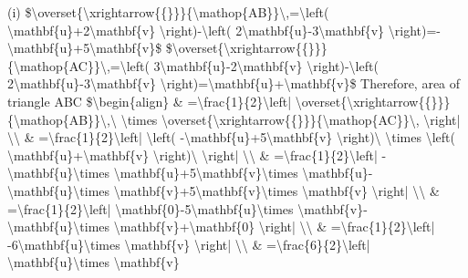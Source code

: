 \item {}

(i) \$\textbackslash overset\{\textbackslash xrightarrow\{\{\}\}\}\{\textbackslash mathop\{AB\}\}\textbackslash ,=\textbackslash left(
\textbackslash mathbf\{u\}+2\textbackslash mathbf\{v\} \textbackslash right)-\textbackslash left(
2\textbackslash mathbf\{u\}-3\textbackslash mathbf\{v\} \textbackslash right)=-\textbackslash mathbf\{u\}+5\textbackslash mathbf\{v\}\$
\$\textbackslash overset\{\textbackslash xrightarrow\{\{\}\}\}\{\textbackslash mathop\{AC\}\}\textbackslash ,=\textbackslash left(
3\textbackslash mathbf\{u\}-2\textbackslash mathbf\{v\} \textbackslash right)-\textbackslash left(
2\textbackslash mathbf\{u\}-3\textbackslash mathbf\{v\} \textbackslash right)=\textbackslash mathbf\{u\}+\textbackslash mathbf\{v\}\$
Therefore, area of triangle ABC \$\textbackslash begin\{align\} \&
=\textbackslash frac\{1\}\{2\}\textbackslash left| \textbackslash overset\{\textbackslash xrightarrow\{\{\}\}\}\{\textbackslash mathop\{AB\}\}\textbackslash ,\textbackslash{}
\textbackslash times \textbackslash overset\{\textbackslash xrightarrow\{\{\}\}\}\{\textbackslash mathop\{AC\}\}\textbackslash ,
\textbackslash right| \textbackslash\textbackslash{} \& =\textbackslash frac\{1\}\{2\}\textbackslash left|
\textbackslash left( -\textbackslash mathbf\{u\}+5\textbackslash mathbf\{v\}
\textbackslash right)\textbackslash{} \textbackslash times \textbackslash left(
\textbackslash mathbf\{u\}+\textbackslash mathbf\{v\} \textbackslash right)\textbackslash{}
\textbackslash right| \textbackslash\textbackslash{} \& =\textbackslash frac\{1\}\{2\}\textbackslash left|
-\textbackslash mathbf\{u\}\textbackslash times \textbackslash mathbf\{u\}+5\textbackslash mathbf\{v\}\textbackslash times
\textbackslash mathbf\{u\}-\textbackslash mathbf\{u\}\textbackslash times
\textbackslash mathbf\{v\}+5\textbackslash mathbf\{v\}\textbackslash times
\textbackslash mathbf\{v\} \textbackslash right| \textbackslash\textbackslash{}
\& =\textbackslash frac\{1\}\{2\}\textbackslash left| \textbackslash mathbf\{0\}-5\textbackslash mathbf\{u\}\textbackslash times
\textbackslash mathbf\{v\}-\textbackslash mathbf\{u\}\textbackslash times
\textbackslash mathbf\{v\}+\textbackslash mathbf\{0\} \textbackslash right|
\textbackslash\textbackslash{} \& =\textbackslash frac\{1\}\{2\}\textbackslash left|
-6\textbackslash mathbf\{u\}\textbackslash times \textbackslash mathbf\{v\}
\textbackslash right| \textbackslash\textbackslash{} \& =\textbackslash frac\{6\}\{2\}\textbackslash left|
\textbackslash mathbf\{u\}\textbackslash times \textbackslash mathbf\{v\}
